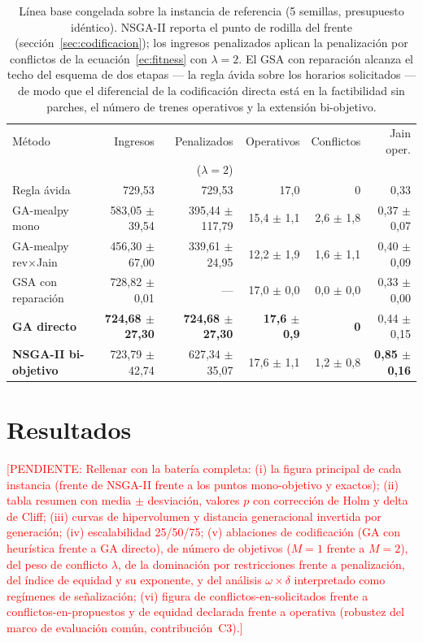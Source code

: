 \documentclass[11pt,a4paper]{article}
\newcommand{\pendiente}[1]{\textcolor{red}{[PENDIENTE: #1]}}
\begin{document}
\begin{table}[t]
\centering
\small
\setlength{\tabcolsep}{4pt}
\begin{tabular}{@{}lrrrrr@{}}
\toprule
Método & Ingresos & Penalizados & Operativos & Conflictos & Jain oper. \\
 & & ($\lambda{=}2$) & & & \\
\midrule
Regla ávida~\cite{paper1} & 729,53 & 729,53 & 17,0 & 0 & 0,33 \\
GA-mealpy mono~\cite{paper1} & 583,05 $\pm$ 39,54 & 395,44 $\pm$ 117,79 & 15,4 $\pm$ 1,1 & 2,6 $\pm$ 1,8 & 0,37 $\pm$ 0,07 \\
GA-mealpy rev$\times$Jain~\cite{paper2} & 456,30 $\pm$ 67,00 & 339,61 $\pm$ 24,95 & 12,2 $\pm$ 1,9 & 1,6 $\pm$ 1,1 & 0,40 $\pm$ 0,09 \\
GSA con reparación & 728,82 $\pm$ 0,01 & --- & 17,0 $\pm$ 0,0 & 0,0 $\pm$ 0,0 & 0,33 $\pm$ 0,00 \\
\textbf{GA directo} & \textbf{724,68 $\pm$ 27,30} & \textbf{724,68 $\pm$ 27,30} & \textbf{17,6 $\pm$ 0,9} & \textbf{0} & 0,44 $\pm$ 0,15 \\
\textbf{NSGA-II bi-objetivo} & 723,79 $\pm$ 42,74 & 627,34 $\pm$ 35,07 & 17,6 $\pm$ 1,1 & 1,2 $\pm$ 0,8 & \textbf{0,85 $\pm$ 0,16} \\
\bottomrule
\end{tabular}
\caption{Línea base congelada sobre la instancia de referencia (5 semillas,
presupuesto idéntico). NSGA-II reporta el punto de rodilla del frente
(sección~\ref{sec:codificacion}); los ingresos penalizados aplican la
penalización por conflictos de la ecuación~\eqref{ec:fitness} con
$\lambda{=}2$. El GSA con reparación alcanza
el techo del esquema de dos etapas --- la regla ávida sobre los horarios
solicitados --- de modo que el diferencial de la codificación directa está en
la factibilidad sin parches, el número de trenes operativos y la extensión
bi-objetivo.}
\label{tab:baseline}
\end{table}

\section{Resultados}
\label{sec:resultados}

\pendiente{Rellenar con la batería completa: (i) la figura principal de cada
instancia (frente de NSGA-II frente a los puntos mono-objetivo y exactos);
(ii) tabla resumen con media $\pm$ desviación, valores $p$ con corrección de
Holm y delta de Cliff; (iii) curvas de hipervolumen y distancia generacional
invertida por generación; (iv) escalabilidad 25/50/75; (v) ablaciones de
codificación (GA con heurística frente a GA directo), de número de objetivos
($M{=}1$ frente a $M{=}2$), del peso de conflicto $\lambda$, de la
dominación por restricciones frente a penalización, del índice de equidad y
su exponente, y del análisis $\omega \times \delta$ interpretado como
regímenes de señalización; (vi) figura de conflictos-en-solicitados frente a
conflictos-en-propuestos y de equidad declarada frente a operativa
(robustez del marco de evaluación común, contribución~C3).}
\end{document}
